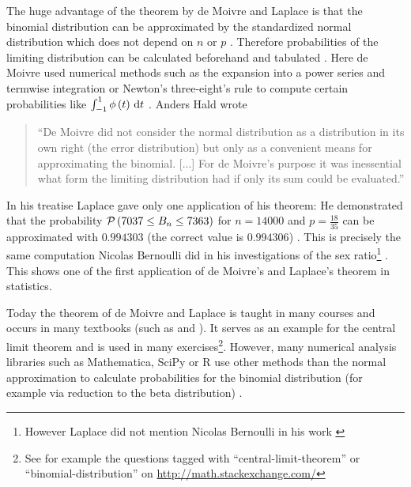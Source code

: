 The huge advantage of the theorem by de Moivre and Laplace is that the binomial distribution can be approximated by the standardized normal distribution which does not depend on $n$ or $p$ \cite[p. 492]{hald1}. Therefore probabilities of the limiting distribution can be calculated beforehand and tabulated \cite[p. 21]{hald2}. Here de Moivre used numerical methods such as the expansion into a power series and termwise integration or Newton's three-eight's rule to compute certain probabilities like $\int_{-1}^1 \phi\left( {t} \right) \,\mathrm d{t}$ \cite[p. 21]{hald2}. Anders Hald wrote \cite[p. 492]{hald1}

\begin{quote}
  ``De Moivre did not consider the normal distribution as a distribution in its own right (the error distribution) but only as a convenient means for approximating the binomial. [...] For de Moivre's purpose it was inessential what form the limiting distribution had if only its sum could be evaluated.''
\end{quote}

In his treatise Laplace gave only one application of his theorem: He demonstrated that the probability $\mathcal P\left({7037 \le B_{n} \le 7363}\right)$ for $n=14000$ and $p=\frac{18}{35}$ can be approximated with $0.994303$ (the correct value is $0.994306$) \cite[.497]{hald1}\cite[p. 25]{hald2}. This is precisely the same computation Nicolas Bernoulli did in his investigations of the sex ratio\footnote{However Laplace did not mention Nicolas Bernoulli in his work \cite[p. 25]{hald2}} \cite[p. 25]{hald2}. This shows one of the first application of de Moivre's and Laplace's theorem in statistics.

Today the theorem of de Moivre and Laplace is taught in many courses and occurs in many textbooks (such as \cite[pp. 64-67]{irle} and \cite[pp. 131-134]{georgii}). It serves as an example for the central limit theorem and is used in many exercises\footnote{See for example the questions tagged with ``central-limit-theorem'' or ``binomial-distribution'' on \url{http://math.stackexchange.com/}}. However, many numerical analysis libraries such as Mathematica, SciPy or R use other methods than the normal approximation to calculate probabilities for the binomial distribution (for example via reduction to the beta distribution) \cite{mathematica}\cite{scipy}\cite{r}.
